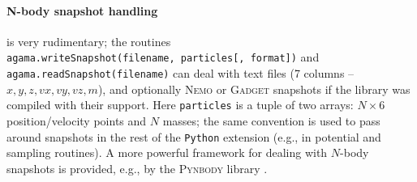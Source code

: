 \documentclass[12pt]{article}
\newcommand{\Nemo} {\textsc{Nemo}\xspace}
\newcommand{\Python}{\texttt{Python}\xspace}
\newcommand{\ppp}[1]{\textcolor{darkolive} {\texttt{#1}}}
\begin{document}
\paragraph{N-body snapshot handling} \label{sec:PythonSnapshot} is very rudimentary; the routines\\
\texttt{agama.writeSnapshot(filename, particles[, format])} and\\ \texttt{agama.readSnapshot(filename)} can deal with text files (7 columns -- $x,y,z,vx,vy,vz,m$), and optionally \Nemo or \textsc{Gadget} snapshots if the library was compiled with their support. Here \ppp{particles} is a tuple of two arrays: $N\times6$ position/velocity points and $N$ masses; the same convention is used to pass around snapshots in the rest of the \Python extension (e.g., in potential and sampling routines). A more powerful framework for dealing with $N$-body snapshots is provided, e.g., by the \textsc{Pynbody} library \cite{Pynbody}.
\end{document}
